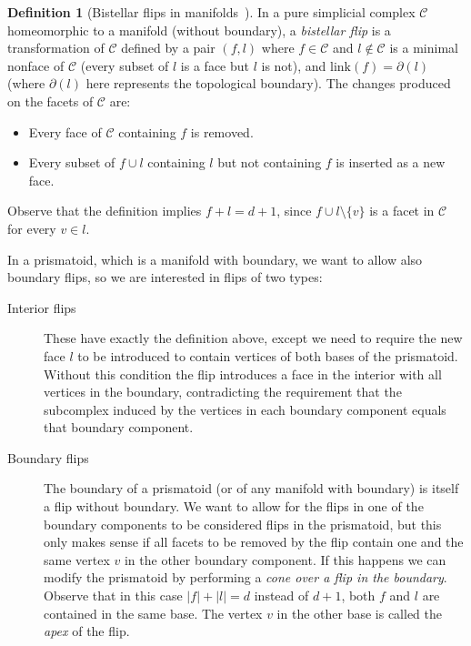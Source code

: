\documentclass[12pt,a4paper]{article}
\theoremstyle{plain}
\theoremstyle{definition}
\newtheorem{definition}{Definition}
\begin{document}
\begin{definition}[Bistellar flips in manifolds~\cite{Lutz,Pachner}]
\label{Bistellar flips}
  In a pure simplicial complex $\mathcal{C}$ homeomorphic to a manifold (without boundary), a \emph{bistellar flip} is a transformation of $\mathcal{C}$ defined by a pair  $(f,l)$ where $f\in\mathcal{C}$ and $l\notin\mathcal{C}$ is a minimal nonface of $\mathcal{C}$ (every subset of $l$ is a face but $l$ is not), and $\text{link}(f)=\partial(l)$ (where $\partial (l)$ here represents the topological boundary). The changes produced on the facets of $\mathcal{C}$ are:
  \begin{itemize}
    \item Every face of $\mathcal{C}$ containing $f$ is removed.
    \item Every subset of  $f\cup l$ containing $l$ but not containing $f$ is inserted as a new face.
  \end{itemize}
\end{definition}

Observe that the definition implies $f+l=d+1$, since $f\cup l\setminus \{v\}$ is a facet in $\mathcal{C}$ for every $v\in l$.

In a prismatoid, which is a manifold with boundary, we want to allow also boundary flips, so we are interested in flips of two types:

\begin{description}
  \item[Interior flips] These have exactly the definition above, except we need to require the new face $l$ to be introduced to contain vertices of both bases of the prismatoid. Without this condition the flip introduces a face in the interior with all vertices in the boundary, contradicting the requirement that the subcomplex induced by the vertices in each boundary component equals that boundary component.

    \item[Boundary flips]  The boundary of a prismatoid (or of any manifold with boundary) is itself a flip without boundary. We want to allow for the flips in one of the  boundary components to be considered flips in the prismatoid, but this only makes sense if all facets to be removed by the flip contain one and the same vertex $v$ in the other boundary component. If this happens we can modify the prismatoid by performing a \emph{cone over a flip in the boundary}. Observe that in this case $|f|+|l|=d$ instead of $d+1$, both $f$ and $l$ are contained in the same base. The vertex $v$ in the other base is called the \emph{apex} of the flip.
\end{description}
\end{document}
